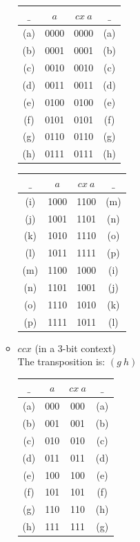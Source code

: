 \documentclass[11pt]{article}
\begin{document}
\begin{enumerate}
\begin{itemize}
	\begin{tabular}{c|c|c|c}
		$\_$ & $a$ & $cx\ a$ & $\_$ \\
		\hline (a) &  0000 &  0000 & (a) \\  
		\hline (b) &  0001 &  0001 & (b) \\ 
		\hline (c) &  0010 &  0010 & (c) \\ 
		\hline (d) &  0011 &  0011 & (d) \\ 
		\hline (e) &  0100 &  0100 & (e) \\ 
		\hline (f) &  0101 &  0101 & (f) \\ 
		\hline (g) &  0110 &  0110 & (g) \\ 
		\hline (h) &  0111 &  0111 & (h) \\ 
	\end{tabular}
	\quad\quad
	\begin{tabular}{c|c|c|c}
		$\_$ & $a$ & $cx\ a$ & $\_$ \\
		\hline (i) &  1000 &  1100 & (m) \\ 
		\hline (j) &  1001 &  1101 & (n) \\ 
		\hline (k) &  1010 &  1110 & (o) \\ 
		\hline (l) &  1011 &  1111 & (p) \\ 
		\hline (m) &  1100 &  1000 & (i) \\ 
		\hline (n) &  1101 &  1001 & (j) \\ 
		\hline (o) &  1110 &  1010 & (k) \\ 
		\hline (p) &  1111 &  1011 & (l)
	\end{tabular}

	\newpage

	\item $ccx$ (in a 3-bit context) \\
	The transposition is: $(g\ h)$ 

	\begin{tabular}{c|c|c|c}
	$\_$ & $a$ & $cx\ a$ & $\_$ \\

		\hline (a) &  000 &  000 & (a) \\
		\hline (b) &  001 &  001 & (b) \\
		\hline (c) &  010 &  010 & (c) \\  
		\hline (d) &  011 &  011 & (d) \\ 
		\hline (e) &  100 &  100 & (e) \\ 
		\hline (f) &  101 &  101 & (f) \\ 
		\hline (g) &  110 &  110 & (h) \\ 
		\hline (h) &  111 &  111 & (g) 


\end{tabular}
\end{itemize}
\end{enumerate}
\end{document}
